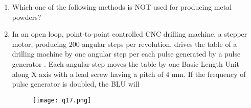 \documentclass[journal,12pt,onecolumn]{IEEEtran}
\theoremstyle{remark}
\begin{document}
\begin{enumerate}
    \hfill{}
    \begin{enumerate}
    \end{enumerate}

    \item Which one of the following methods is NOT used for producing metal powders?
    
    \hfill{}
    \begin{enumerate}
    \end{enumerate}

    \item In an open loop, point-to-point controlled CNC drilling machine, a stepper motor, producing $200$ angular steps per revolution, drives the table of a drilling machine by one angular step per each pulse generated by a pulse generator . Each angular step moves the table by one Basic Length Unit  along X axis with a lead screw having a pitch of $4$ mm. If the frequency of pulse generator is doubled, the BLU will
    \begin{figure}[H]
        \centering
        \texttt{[image: q17.png]}
        \caption*{}
        \label{fig:q17}
    \end{figure}
    
    \hfill{}
    \begin{enumerate}
    \end{enumerate}


\end{enumerate}
\end{document}
